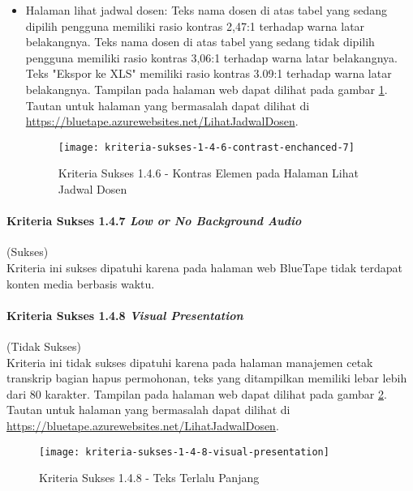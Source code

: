 \begin{itemize}
    \item Halaman lihat jadwal dosen: Teks nama dosen di atas tabel yang sedang dipilih pengguna memiliki rasio kontras 2,47:1 terhadap warna latar belakangnya. Teks nama dosen di atas tabel yang sedang tidak dipilih pengguna memiliki rasio kontras 3,06:1 terhadap warna latar belakangnya. Teks "Ekspor ke XLS" memiliki rasio kontras 3.09:1 terhadap warna latar belakangnya. Tampilan pada halaman web dapat dilihat pada gambar \ref{fig:1.4.6_contrast_enchanced_7}. Tautan untuk halaman yang bermasalah dapat dilihat di \url{https://bluetape.azurewebsites.net/LihatJadwalDosen}.
    \begin{figure}[H]
        \centering  
        \texttt{[image: kriteria-sukses-1-4-6-contrast-enchanced-7]}  
        \caption[Kriteria Sukses 1.4.6 - Kontras Elemen pada Halaman Lihat Jadwal Dosen]{Kriteria Sukses 1.4.6 - Kontras Elemen pada Halaman Lihat Jadwal Dosen}
        \label{fig:1.4.6_contrast_enchanced_7}  
    \end{figure} 
\end{itemize}

\paragraph{Kriteria Sukses 1.4.7 \textit{Low or No Background Audio}}
\label{par:kepatuhan_bluetape_kriteria_sukses_1.4.7}
(Sukses)\\

Kriteria ini sukses dipatuhi karena pada halaman web BlueTape tidak terdapat konten media berbasis waktu.

\paragraph{Kriteria Sukses 1.4.8 \textit{Visual Presentation}}
\label{par:kepatuhan_bluetape_kriteria_sukses_1.4.8}
(Tidak Sukses)\\

Kriteria ini tidak sukses dipatuhi karena pada halaman manajemen cetak transkrip bagian hapus permohonan, teks yang ditampilkan memiliki lebar lebih dari 80 karakter. Tampilan pada halaman web dapat dilihat pada gambar \ref{fig:1.4.8_visual_presentation}. Tautan untuk halaman yang bermasalah dapat dilihat di \url{https://bluetape.azurewebsites.net/LihatJadwalDosen}.

\begin{figure}[H]
    \centering  
    \texttt{[image: kriteria-sukses-1-4-8-visual-presentation]}  
    \caption[Kriteria Sukses 1.4.8 - Teks Terlalu Panjang]{Kriteria Sukses 1.4.8 - Teks Terlalu Panjang}
    \label{fig:1.4.8_visual_presentation}  
\end{figure} 

